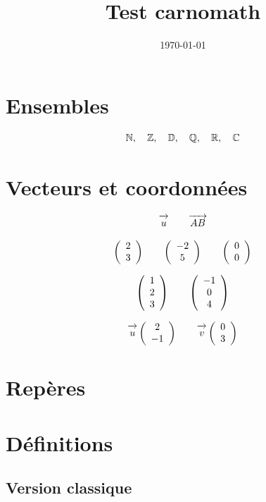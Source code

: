 \documentclass[a4paper,11pt]{article}
\title{Test carnomath}
\date{\today}
\begin{document}
\maketitle
\tableofcontents

\section{Ensembles}

\[
\N,\quad \Z,\quad \D,\quad \Q,\quad \R,\quad \Cp
\]

\section{Vecteurs et coordonnées}

\[
\vc{u}
\qquad
\vc{AB}
\]

\[
\coord{2}{3}
\qquad
\coord{-2}{5}
\qquad
\coord{0}{0}
\]

\[
\coor{1}{2}{3}
\qquad
\coor{-1}{0}{4}
\]

\[
\vct{u}{2}{-1}
\qquad
\vct{v}{0}{3}
\]

\section{Repères}

\Oij

\Oijk

\section{Définitions}

\subsection{Version classique}

\end{document}
